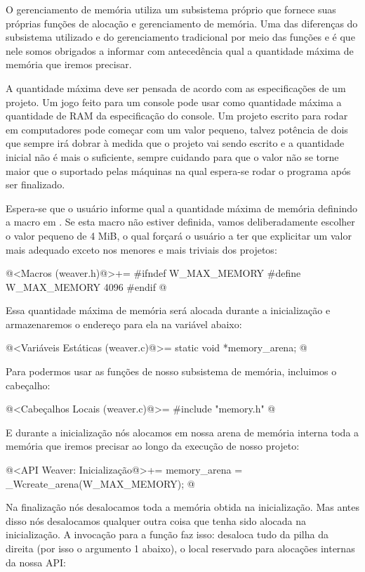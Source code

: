 
O gerenciamento de memória utiliza um subsistema próprio que fornece
suas próprias funções de alocação e gerenciamento de memória. Uma das
diferenças do subsistema utilizado e do gerenciamento tradicional por
meio das funções  e  é que nele
somos obrigados a informar com antecedência qual a quantidade máxima
de memória que iremos precisar.

A quantidade máxima deve ser pensada de acordo com as especificações
de um projeto. Um jogo feito para um console pode usar como quantidade
máxima a quantidade de RAM da especificação do console. Um projeto
escrito para rodar em computadores pode começar com um valor pequeno,
talvez potência de dois que sempre irá dobrar à medida que o projeto
vai sendo escrito e a quantidade inicial não é mais o suficiente,
sempre cuidando para que o valor não se torne maior que o suportado
pelas máquinas na qual espera-se rodar o programa após ser finalizado.

Espera-se que o usuário informe qual a quantidade máxima de memória
definindo a macro 
em . Se esta macro não estiver definida, vamos
deliberadamente escolher o valor pequeno de 4 MiB, o qual forçará o
usuário a ter que explicitar um valor mais adequado exceto nos
menores e mais triviais dos projetos:

\iniciocodigo
@<Macros (weaver.h)@>+=
#ifndef W_MAX_MEMORY
#define W_MAX_MEMORY 4096
#endif
@
\fimcodigo

Essa quantidade máxima de memória será alocada durante a inicialização
e armazenaremos o endereço para ela na variável abaixo:

\iniciocodigo
@<Variáveis Estáticas (weaver.c)@>=
static void *memory_arena;
@
\fimcodigo

Para podermos usar as funções de nosso subsistema de memória,
incluimos o cabeçalho:

\iniciocodigo
@<Cabeçalhos Locais (weaver.c)@>=
#include "memory.h"
@
\fimcodigo

E durante a inicialização nós alocamos em nossa arena de memória
interna toda a memória que iremos precisar ao longo da execução de
nosso projeto:

\iniciocodigo
@<API Weaver: Inicialização@>+=
memory_arena = _Wcreate_arena(W_MAX_MEMORY);
@
\fimcodigo

Na finalização nós desalocamos toda a memória obtida na
inicialização. Mas antes disso nós desalocamos qualquer outra coisa
que tenha sido alocada na inicialização. A invocação para a
função  faz isso: desaloca tudo da pilha da
direita (por isso o argumento 1 abaixo), o local reservado para
alocações internas da nossa API:

